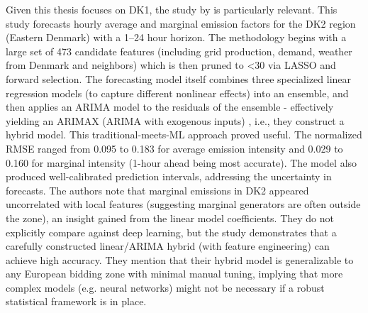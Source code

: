 Given this thesis focuses on DK1, the study by \textcite{leerbeck2020} is particularly relevant. This study forecasts hourly average and marginal \cotwo{} emission factors for the DK2 region (Eastern Denmark) with a 1--24 hour horizon. The methodology begins with a large set of 473 candidate features (including grid production, demand, weather from Denmark and neighbors) which is then pruned to \textless30 via LASSO and forward selection. The forecasting model itself combines three specialized linear regression models (to capture different nonlinear effects) into an ensemble, and then applies an ARIMA model to the residuals of the ensemble - effectively yielding an ARIMAX (ARIMA with exogenous inputs) , i.e., they construct a hybrid model. This traditional-meets-ML approach proved useful. The normalized RMSE ranged from 0.095 to 0.183 for average emission intensity and 0.029 to 0.160 for marginal intensity (1-hour ahead being most accurate). The model also produced well-calibrated prediction intervals, addressing the uncertainty in \cotwo{} forecasts. The authors note that marginal emissions in DK2 appeared uncorrelated with local features (suggesting marginal generators are often outside the zone), an insight gained from the linear model coefficients. They do not explicitly compare against deep learning, but the study demonstrates that a carefully constructed linear/ARIMA hybrid (with feature engineering) can achieve high accuracy. They mention that their hybrid model is generalizable to any European bidding zone with minimal manual tuning, implying that more complex models (e.g. neural networks) might not be necessary if a robust statistical framework is in place.

